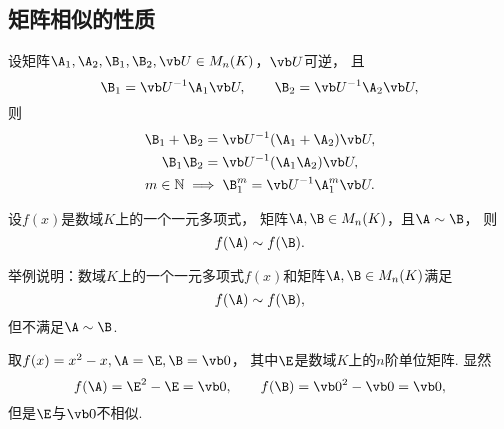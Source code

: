 \subsection{矩阵相似的性质}
\begin{proposition}
设矩阵\(\A_1,\A_2,\B_1,\B_2,\P \in M_n(K)\)，\(\P\)可逆，
且\[
	\B_1=\P^{-1}\A_1\P, \qquad
	\B_2=\P^{-1}\A_2\P,
\]
则\begin{gather}
	\B_1 + \B_2 = \P^{-1} (\A_1 + \A_2) \P, \\
	\B_1 \B_2 = \P^{-1} (\A_1 \A_2) \P, \\
	m\in\mathbb{N} \implies \B_1^m = \P^{-1}\A_1^m\P.
		\label{equation:相似矩阵.利用相似性简化计算}
\end{gather}
\end{proposition}
\begin{corollary}\label{theorem:相似矩阵.相似矩阵的多项式相似}
设\(f(x)\)是数域\(K\)上的一个一元多项式，
矩阵\(\A,\B \in M_n(K)\)，且\(\A \sim \B\)，
则\[
	f(\A) \sim f(\B).
\]
\end{corollary}
\begin{example}
举例说明：数域\(K\)上的一个一元多项式\(f(x)\)和矩阵\(\A,\B \in M_n(K)\)满足\begin{equation*}
	f(\A) \sim f(\B),
\end{equation*}
但不满足\(\A \sim \B\).
\begin{solution}
取\(f(x) = x^2 - x,
\A = \E,
\B = \vb0\)，
其中\(\E\)是数域\(K\)上的\(n\)阶单位矩阵.
显然\begin{equation*}
	f(\A) = \E^2 - \E = \vb0,
	\qquad
	f(\B) = \vb0^2 - \vb0 = \vb0,
\end{equation*}
但是\(\E\)与\(\vb0\)不相似.
\end{solution}
\end{example}

